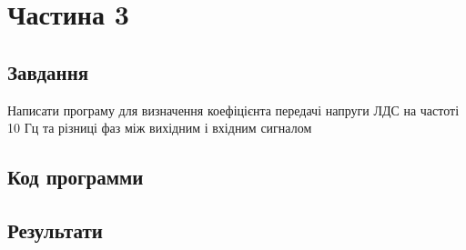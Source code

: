 \section{Частина 3}
\label{sec:task3}

\subsection{Завдання}
\label{subsec:task3_task}

Написати програму для визначення коефіцієнта передачі напруги ЛДС
на частоті 10 Гц та різниці фаз між вихідним і вхідним сигналом

\subsection{Код программи}
\label{subsec:task3_code}

\subsection{Результати}
\label{subsec:task3_results}
